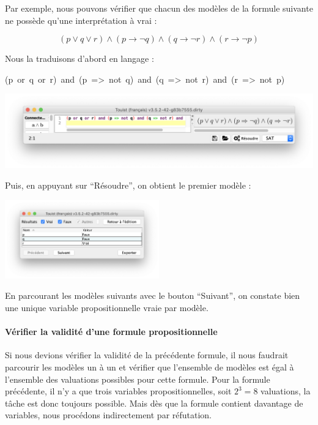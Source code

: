 Par exemple, nous pouvons vérifier que chacun des modèles de la formule suivante ne possède qu'une interprétation à vrai :

\[(p \vee q \vee r) \wedge (p \rightarrow \neg q) \wedge (q \rightarrow \neg r) \wedge (r\rightarrow \neg p)\]

\noindent
Nous la traduisons d'abord en langage \touist :

\begin{mdpre}%
\noindent(p~or~q~or~r)~and~(p~=\textgreater{}~not~q)~and~(q~=\textgreater{}~not~r)~and~(r~=\textgreater{}~not~p)%
\end{mdpre}%

\begin{center}
    \includegraphics[width=\textwidth]{figures/screenshot-formule.png}
\end{center}

\noindent
Puis, en appuyant sur \enquote{Résoudre}, on obtient le premier modèle :

\begin{center}
    \includegraphics[width=0.5\textwidth]{figures/screenshot-modele.png} \label{fig:screenshot-modele}    
\end{center}

\noindent
En parcourant les modèles suivants avec le bouton \enquote{Suivant}, on constate bien une unique variable propositionnelle vraie par modèle.

\paragraph{Vérifier la validité d'une formule propositionnelle}

Si nous devions vérifier la validité de la précédente formule, il nous faudrait parcourir les modèles un à un et vérifier que l'ensemble de modèles est égal à l'ensemble des valuations possibles pour cette formule. Pour la formule précédente, il n'y a que trois variables propositionnelles, soit $2^3 = 8$ valuations, la tâche est donc toujours possible. Mais dès que la formule contient davantage de variables, nous procédons  indirectement par réfutation.

